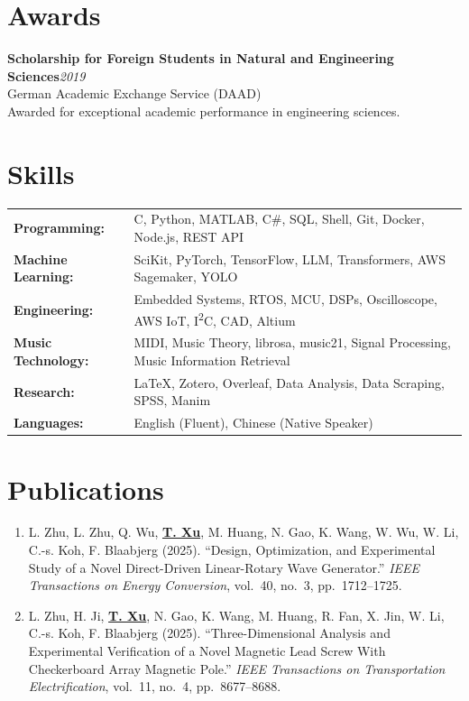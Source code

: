 \documentclass[letterpaper,10pt]{article}
\newcommand{\me}{\underline{\textbf{T. Xu}}}
\newcommand{\paperlink}[1]{\href{#1}{\small\faLink}}
\begin{document}
\section{Awards}

\textbf{Scholarship for Foreign Students in Natural and Engineering Sciences}\hfill\textit{2019}\\
German Academic Exchange Service (DAAD)\\
Awarded for exceptional academic performance in engineering sciences.

\section{Skills}

\noindent\begin{tabularx}{\textwidth}{@{}lX<{\raggedleft}@{}}
  \textbf{Programming:}      & C, Python, MATLAB, C\#, SQL, Shell, Git, Docker, Node.js, REST API \\
  \textbf{Machine Learning:} & SciKit, PyTorch, TensorFlow, LLM, Transformers, AWS Sagemaker, YOLO \\
  \textbf{Engineering:}      & Embedded Systems, RTOS, MCU, DSPs, Oscilloscope, AWS IoT, I\textsuperscript{2}C, CAD, Altium \\
  \textbf{Music Technology:} & MIDI, Music Theory, librosa, music21, Signal Processing, Music Information Retrieval \\
  \textbf{Research:}         & \LaTeX, Zotero, Overleaf, Data Analysis, Data Scraping, SPSS, Manim \\
  \textbf{Languages:}        & English (Fluent), Chinese (Native Speaker) \\
\end{tabularx}

\section{Publications}

\begin{enumerate}
  \item L. Zhu, L. Zhu, Q. Wu, \me, M. Huang, N. Gao, K. Wang, W. Wu, W. Li, C.-s. Koh, F. Blaabjerg (2025).
    ``Design, Optimization, and Experimental Study of a Novel Direct-Driven Linear-Rotary Wave Generator.''
    \textit{IEEE Transactions on Energy Conversion}, vol.~40, no.~3, pp.~1712--1725.
    \paperlink{https://doi.org/10.1109/TEC.2025.3538570}
  \item L. Zhu, H. Ji, \me, N. Gao, K. Wang, M. Huang, R. Fan, X. Jin, W. Li, C.-s. Koh, F. Blaabjerg (2025).
    ``Three-Dimensional Analysis and Experimental Verification of a Novel Magnetic Lead Screw With Checkerboard Array Magnetic Pole.''
    \textit{IEEE Transactions on Transportation Electrification}, vol.~11, no.~4, pp.~8677--8688.
    \paperlink{https://doi.org/10.1109/TTE.2025.3544831}
\end{enumerate}
\end{document}
